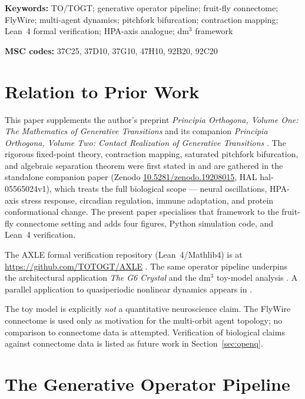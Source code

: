\documentclass[12pt,a4paper]{article}
\begin{document}
\smallskip
\noindent\textbf{Keywords:} TO/TOGT; generative operator pipeline;
fruit-fly connectome; FlyWire; multi-agent dynamics; pitchfork
bifurcation; contraction mapping; Lean~4 formal verification;
HPA-axis analogue; dm$^3$ framework

\noindent\textbf{MSC codes:} 37C25, 37D10, 37G10, 47H10, 92B20, 92C20

\section{Relation to Prior Work}
\label{sec:prior}

This paper supplements the author's preprint
\textit{Principia Orthogona, Volume One: The Mathematics of Generative
Transitions} \cite{Grossi2026_Vol1} and its companion
\textit{Principia Orthogona, Volume Two: Contact Realization of
Generative Transitions} \cite{Grossi2026_Vol2}. The rigorous
fixed-point theory, contraction mapping, saturated pitchfork
bifurcation, and algebraic separation theorem were first stated in
\cite{Grossi2026_Vol1} and are gathered in the standalone companion
paper \cite{Grossi2026_MultiAgent} (Zenodo
\href{https://doi.org/10.5281/zenodo.19208015}{10.5281/zenodo.19208015},
HAL hal-05565024v1), which treats the full biological scope --- neural
oscillations, HPA-axis stress response, circadian regulation, immune
adaptation, and protein conformational change.  The present paper
specialises that framework to the fruit-fly connectome setting and adds
four figures, Python simulation code, and Lean~4 verification.

The AXLE formal verification repository (Lean~4/Mathlib4) is at
\url{https://github.com/TOTOGT/AXLE} \cite{AXLE2026}. The same operator pipeline underpins the architectural
application \textit{The G6 Crystal} \cite{Grossi2026_Crystal} and the
dm$^3$ toy-model analysis \cite{Grossi2026_DM3}. A parallel
application to quasiperiodic nonlinear dynamics appears in
\cite{Grossi2026_DNLS}.

The toy model is explicitly \emph{not} a quantitative neuroscience
claim. The FlyWire connectome \cite{Dorkenwald2024, Schlegel2024} is
used only as motivation for the multi-orbit agent topology; no
comparison to connectome data is attempted. Verification of biological
claims against connectome data is listed as future work in
Section~\ref{sec:openq}.

\section{The Generative Operator Pipeline}
\label{sec:pipeline}
\end{document}
